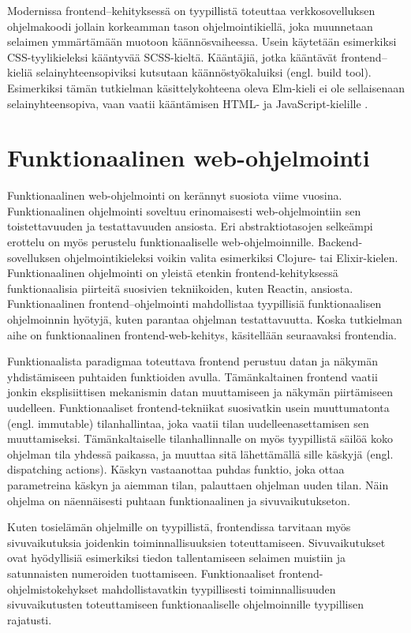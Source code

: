 Modernissa frontend–kehityksessä on tyypillistä toteuttaa verkkosovelluksen ohjelmakoodi jollain korkeamman tason
ohjelmointikiellä, joka muunnetaan selaimen ymmärtämään muotoon käännösvaiheessa. Usein käytetään esimerkiksi
CSS-tyyli\-kieleksi kääntyvää SCSS-kieltä. Kääntäjiä, jotka kääntävät frontend–kieliä selainyhteensopiviksi kutsutaan
käännöstyökaluiksi (engl. build tool). Esimerkiksi tämän tutkielman käsittelykohteena oleva Elm-kieli ei ole
sellaisenaan selainyhteensopiva, vaan vaatii kääntämisen HTML- ja JavaScript-kielille \cite{elmlang}.
\cite{fullstackdeveloper}

\section{Funktionaalinen web-ohjelmointi}
Funktionaalinen web-ohjelmointi on kerännyt suosiota viime vuosina. Funktionaalinen ohjelmointi soveltuu erinomaisesti
web-ohjelmointiin sen toistettavuuden ja testattavuuden ansiosta. Eri abstraktiotasojen selkeämpi erottelu on myös
perustelu funktionaaliselle web-ohjelmoinnille. Backend-sovelluksen ohjelmointikieleksi voikin valita esimerkiksi
Clojure- tai Elixir-kielen. \cite{functionalwebdev} Funktionaalinen ohjelmointi on yleistä etenkin frontend-kehityksessä
funktionaalisia piirteitä suosivien tekniikoiden, kuten Reactin, ansiosta. Funktionaalinen frontend–ohjelmointi
mahdollistaa tyypillisiä funktionaalisen ohjelmoinnin hyötyjä, kuten parantaa ohjelman testattavuutta.
\cite{functionalreact} Koska tutkielman aihe on funktionaalinen frontend-web-kehitys, käsitellään seuraavaksi
frontendia.

Funktionaalista paradigmaa toteuttava frontend perustuu datan ja näkymän yhdistämiseen puhtaiden funktioiden avulla.
Tämänkaltainen frontend vaatii jonkin eksplisiittisen mekanismin datan muuttamiseen ja näkymän piirtämiseen uudelleen.
Funktionaaliset frontend-tekniikat suosivatkin usein muuttumatonta (engl. immutable) tilanhallintaa, joka vaatii tilan
uudelleenasettamisen sen muuttamiseksi. Tämänkaltaiselle tilanhallinnalle on myös tyypillistä säilöä koko ohjelman tila
yhdessä paikassa, ja muuttaa sitä lähettämällä sille käskyjä (engl. dispatching actions). Käskyn vastaanottaa puhdas
funktio, joka ottaa parametreina käskyn ja aiemman tilan, palauttaen ohjelman uuden tilan. Näin ohjelma on näennäisesti
puhtaan funktionaalinen ja sivuvaikutukseton. \cite{functionalreact}

Kuten tosielämän ohjelmille on tyypillistä, frontendissa tarvitaan myös sivuvaikutuksia joidenkin toiminnallisuuksien
toteuttamiseen. Sivuvaikutukset ovat hyödyllisiä esimerkiksi tiedon tallentamiseen selaimen muistiin ja satunnaisten
numeroiden tuottamiseen. Funktionaaliset frontend-ohjelmistokehykset mahdollistavatkin tyypillisesti toiminnallisuuden
sivuvaikutusten toteuttamiseen funktionaaliselle ohjelmoinnille tyypillisen rajatusti. \cite{elmlang}\cite{reactjs}

